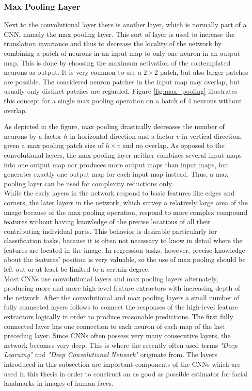 \documentclass[11pt, a4paper]{article}
\newcommand\q[1]{\emph{"#1"}}
\begin{document}
\subsubsection{Max Pooling Layer}
\label{subsubsec:maxpoolinglayer}

Next to the convolutional layer there is another layer, which is normally part of a \ac{CNN}, namely the max pooling layer. This sort of layer is used to increase the translation invariance and thus to decrease the locality of the network by combining a patch of neurons in an input map to only one neuron in an output map. This is done by choosing the maximum activation of the contemplated neurons as output. It is very common to use a $2\times 2$ patch, but also larger patches are possible. The considered neuron patches in the input map may overlap, but usually only distinct patches are regarded. Figure \ref{fig:max_pooling} illustrates this concept for a single max pooling operation on a batch of 4 neurons without overlap.

As depicted in the figure, max pooling drastically decreases the number of neurons by a factor $h$ in horizontal direction and a factor $v$ in vertical direction, given a max pooling patch size of $h\times v$ and no overlap. As opposed to the convolutional layers, the max pooling layer neither combines several input maps into one output map nor produces more output maps than input maps, but generates exactly one output map for each input map instead. Thus, a max pooling layer can be used for complexity reductions only.\\
While the early layers in the network respond to basic features like edges and corners, the later layers in the network, which survey a relatively large area of the image because of the max pooling operation, respond to more complex compound features without having knowledge of the precise locations of all their contributing individual parts. This behavior is desirable particularly for classification tasks, because it is often not necessary to know in detail where the features are located in the image. In regression tasks, however, precise knowledge about the features' position is very valuable, so the use of max pooling should be left out or at least be limited to a certain degree.\\%
Most \acp{CNN} use convolutional layers and max pooling layers alternately, producing more and more high-level feature extractors with increasing depth of the network. After the convolutional and max pooling layers a small number of fully connected layers follows to connect the responses of the high-level feature extractors logically in order to produce reasonable predictions. The first fully connected layer has one connection to each neuron of each map of the last preceding layer. Since \acp{CNN} often possess very many consecutive layers, the network becomes very deep. This is where the recently often used terms \q{Deep Learning} and \q{Deep Convolutional Network} originate from. The layers introduced in this subsection are important components of the \acp{CNN} which are used in this thesis in order to construct an as good as possible estimator for facial landmarks in images of human faces.
\newpage
\end{document}
